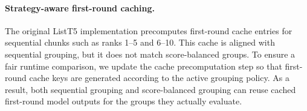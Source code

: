 \paragraph{Strategy-aware first-round caching.}
The original ListT5 implementation precomputes first-round cache entries for sequential chunks such as ranks 1--5 and 6--10.
This cache is aligned with sequential grouping, but it does not match score-balanced groups.
To ensure a fair runtime comparison, we update the cache precomputation step so that first-round cache keys are generated according to the active grouping policy.
As a result, both sequential grouping and score-balanced grouping can reuse cached first-round model outputs for the groups they actually evaluate.

